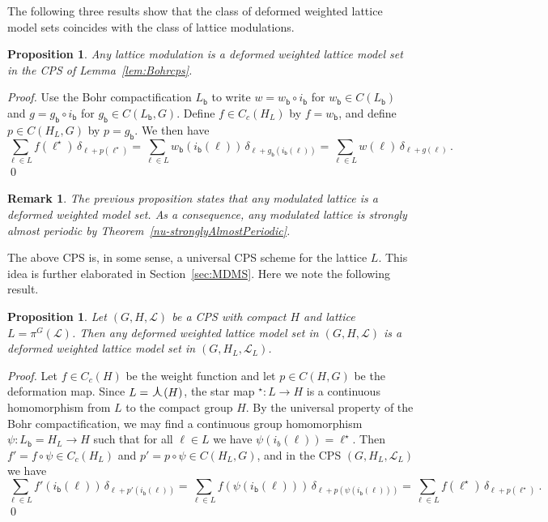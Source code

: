 \documentclass[11pt, a4wide]{amsart}
\newcommand{\oplam}{\mbox{\Large $\curlywedge$}}
\newcommand{\cL}{\mathcal L}
\newtheorem{proposition}[lemma]{Proposition}
\newtheorem{remark}[lemma]{Remark}
\numberwithin{lemma}{section}
\begin{document}
The following three results show that the class of deformed weighted lattice model sets coincides with the class of lattice modulations.

\begin{proposition} \label{stronglyAlmostPeriodic-of-deltaLambda}
Any lattice modulation is a deformed weighted lattice model set in the CPS of Lemma~\ref{lem:Bohrcps}.
\end{proposition}

\begin{proof}

Use the Bohr compactification $L_\mathsf{b}$ to write $w=w_\mathsf{b}\circ i_\mathsf{b}$ for $w_\mathsf{b}\in C(L_\mathsf{b})$ and $g=g_\mathsf{b}\circ i_\mathsf{b}$ for $g_\mathsf{b}\in C(L_\mathsf{b}, G)$. Define $f\in C_c(H_L)$ by $f=w_\mathsf{b}$, and define $p\in C(H_L,G)$ by $p=g_\mathsf{b}$. We then have
%
\begin{displaymath}
\sum_{\ell\in L} f(\ell^\star)\,\delta_{\ell+p(\ell^\star)}=\sum_{\ell\in L} w_\mathsf{b}(i_\mathsf{b}(\ell))\,\delta_{\ell+g_\mathsf{b}(i_\mathsf{b}(\ell))}=
\sum_{\ell\in L} w(\ell)\,\delta_{\ell+g(\ell)}\,.
\end{displaymath}
%
\qed
\end{proof}

\begin{remark}\label{rem:modlat}
The previous proposition states that any modulated lattice is a  deformed weighted model set. As a consequence, any modulated lattice is strongly almost periodic by Theorem~\ref{nu-stronglyAlmostPeriodic}.
\end{remark}

The above CPS is, in some sense, a universal CPS scheme for the lattice $L$. This idea is further elaborated in Section~\ref{sec:MDMS}. Here we note the following result.

\begin{proposition}
Let $(G,H,\cL)$ be a CPS with compact $H$ and lattice $L=\pi^G(\cL)$. Then any deformed weighted lattice model set in $(G,H,\cL)$  is a deformed weighted lattice model set in $(G, H_L, \cL_L)$.
\end{proposition}

\begin{proof}
Let $f\in C_c(H)$ be the weight function and let $p \in C(H,G)$ be the deformation map.
Since $L= \oplam(H)$, the star map ${}^\star : L \to H$ is a continuous homomorphism from $L$ to the compact group $H$. By the universal property of the Bohr compactification, we may find a continuous group homomorphism $\psi : L_\mathsf{b}=H_L \to H$ such that for all $\ell \in L$ we have $\psi( i_b(\ell))=\ell^\star$. Then $f'=f\circ \psi\in C_c(H_L)$ and $p'=p \circ \psi \in C(H_L, G)$, and in the CPS $(G, H_L, \cL_L)$ we have
%
\begin{displaymath}
\sum_{\ell \in L} f'(i_\mathsf{b}(\ell)) \, \delta_{\ell+p'(i_\mathsf{b}(\ell))}=\sum_{\ell \in L} f(\psi(i_\mathsf{b}(\ell))) \, \delta_{\ell+p(\psi(i_\mathsf{b}(\ell)))}=\sum_{\ell \in L} f(\ell^\star) \, \delta_{\ell+p(\ell^\star)} \ .
\end{displaymath}
%
\qed
\end{proof}
\end{document}
